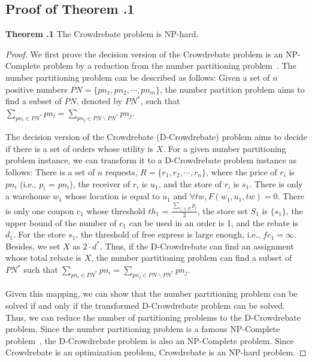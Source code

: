 \appendix

\subsection{Proof of Theorem \uppercase\expandafter{}.1}
\noindent\textbf{Theorem \uppercase\expandafter{}.1}
The Crowdrebate problem is NP-hard.

\begin{proof}
	We first prove the decision version of the Crowdrebate problem is an NP-Complete problem by a reduction from the number partitioning problem~\cite{hayes2002computing}. The number partitioning problem can be described as follows: Given a set of $n$ positive numbers $PN = \{pn_1, pn_2, \cdots, pn_m\}$, the number partition problem aims to find a subset of $PN$, denoted by $PN^*$, such that $\sum_{pn_i \in PN^*} pn_i = \sum_{pn_j \in PN \backslash PN^*} pn_j$.
	
	The decision version of the Crowdrebate (D-Crowdrebate) problem aims to decide if there is a set of orders whose utility is $X$. For a given number partitioning problem instance, we can transform it to a D-Crowdrebate problem instance as follows: There is a set of $n$ requests, $R = \{r_1, r_2, \cdots, r_n\}$, where the price of $r_i$ is $pn_i$ (i.e., $p_i$ = $pn_i$), the receiver of $r_i$ is $u_1$, and the store of $r_i$ is $s_1$. There is only a warehouse $w_1$ whose location is equal to $u_1$ and $\forall tw, F(w_1, u_1, tw) = 0$. There is only one coupon $c_1$ whose threshold $th_1$ = $\frac{\sum_{r_i \in R} p_i}{2}$, the store set $S_1$ is $\{s_1\}$, the upper bound of the number of $c_1$ can be used in an order is 1, and the rebate is $d_1$. For the store $s_1$, the threshold of free express is large enough, i.e., $fe_1 = \infty$. Besides, we set $X$ as $2 \cdot d^*$. Thus, if the D-Crowdrebate can find an assignment whose total rebate is $X$, the number partitioning problem can find a subset of $PN^*$ such that $\sum_{pn_i \in PN^*} pn_i = \sum_{pn_j \in PN \backslash PN^*} pn_j$.
	
	Given this mapping, we can show that the number partitioning problem can be solved if and only if the transformed D-Crowdrebate problem can be solved. Thus, we can reduce the number of partitioning problems to the D-Crowdrebate problem. Since the number partitioning problem is a famous NP-Complete problem~\cite{hayes2002computing}, the D-Crowdrebate problem is also an NP-Complete problem. Since Crowdrebate is an optimization problem, Crowdrebate is an NP-hard problem.
\end{proof}


